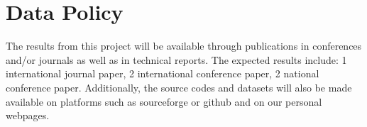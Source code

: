 \section{Data Policy}
\label{sec:data-policy}


The results from this project will be available through publications in conferences and/or journals as well as in technical reports. The expected results include: 1 international journal paper, 2 international conference paper, 2 national conference paper.
Additionally, the source codes and datasets will also be made available on platforms such as sourceforge or github and on our personal webpages. 